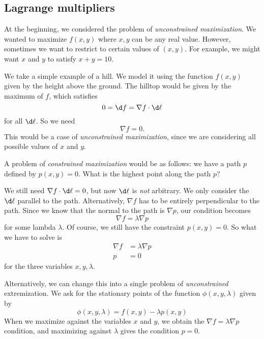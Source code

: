\documentclass[a4paper]{article}
\begin{document}
\subsection{Lagrange multipliers}
At the beginning, we considered the problem of \emph{unconstrained maximization}. We wanted to maximize $f(x, y)$ where $x, y$ can be any real value. However, sometimes we want to restrict to certain values of $(x, y)$. For example, we might want $x$ and $y$ to satisfy $x + y = 10$.

We take a simple example of a hill. We model it using the function $f(x, y)$ given by the height above the ground. The hilltop would be given by the maximum of $f$, which satisfies
\[
  0 = \d f = \nabla f\cdot \d \mathbf{\ell}
\]
for all $\d \mathbf{\ell}$. So we need
\[
  \nabla f = 0.
\]
This would be a case of \emph{unconstrained maximization}, since we are considering all possible values of $x$ and $y$.

A problem of \emph{constrained maximization} would be as follows: we have a path $p$ defined by $p(x, y) = 0$. What is the highest point along the path $p$?

We still need $\nabla f \cdot \d \mathbf{\ell} = 0$, but now $\d \mathbf{\ell}$ is \emph{not} arbitrary. We only consider the $\d \ell$ parallel to the path. Alternatively, $\nabla f$ has to be entirely perpendicular to the path. Since we know that the normal to the path is $\nabla p$, our condition becomes
\[
  \nabla f = \lambda \nabla p
\]
for some lambda $\lambda$. Of course, we still have the constraint $p(x, y) = 0$. So what we have to solve is
\begin{align*}
  \nabla f &= \lambda \nabla p\\
  p &= 0
\end{align*}
for the three variables $x, y, \lambda$.

Alternatively, we can change this into a single problem of \emph{unconstrained} extremization. We ask for the stationary points of the function $\phi(x, y, \lambda)$ given by
\[
  \phi(x, y, \lambda) = f(x, y) - \lambda p(x, y)
\]
When we maximize against the variables $x$ and $y$, we obtain the $\nabla f = \lambda \nabla p$ condition, and maximizing against $\lambda$ gives the condition $p = 0$.
\end{document}
